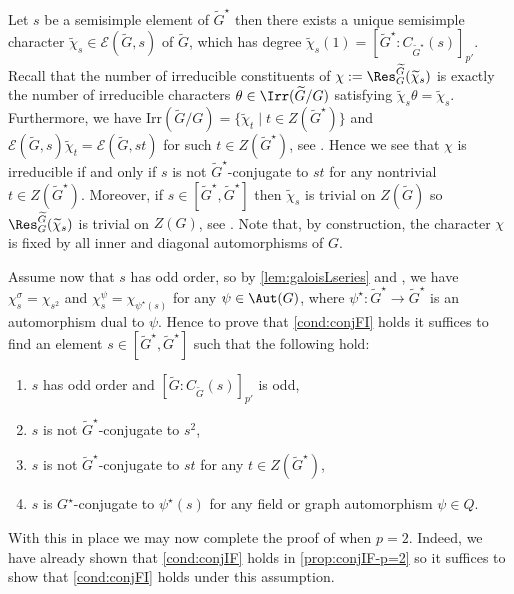 \documentclass[eqthmnum, nocolour]{jt-calcs}
\newcommand{\irr}{\mathrm{Irr}}
\begin{document}
\begin{pa}
Let $s$ be a semisimple element of $\widetilde{G}^\star$ then there exists a unique semisimple character $\widetilde{\chi}_s \in \mathcal{E}(\widetilde{G}, s)$ of $\widetilde{G}$, which has degree $\widetilde{\chi}_s(1) = [\widetilde{G}^{\star}:C_{\widetilde{G}^{\star}}(s)]_{p'}$. Recall that the number of irreducible constituents of $\chi := \Res_G^{\widetilde{G}}(\widetilde{\chi}_s)$ is exactly the number of irreducible characters $\theta \in \Irr(\widetilde{G}/G)$ satisfying $\widetilde{\chi}_s\theta = \widetilde{\chi}_s$. Furthermore, we have $\irr(\widetilde{G}/G) = \{\widetilde{\chi}_t \mid t \in Z(\widetilde{G}^{\star})\}$ and $\mathcal{E}(\widetilde{G}, s)\widetilde{\chi}_t = \mathcal{E}(\widetilde{G}, st)$ for such $t \in Z(\widetilde{G}^{\star})$, see \cite[13.30]{digne-michel:1991:representations-of-finite-groups-of-lie-type}. Hence we see that $\chi$ is irreducible if and only if $s$ is not $\widetilde{G}^\star$-conjugate to $st$ for any nontrivial $t\in Z(\widetilde{G}^\star)$. Moreover, if $s \in [\widetilde{G}^\star, \widetilde{G}^\star]$ then $\widetilde{\chi}_s$ is trivial on $Z(\widetilde{G})$ so $\Res^{\widetilde{G}}_G(\widetilde{\chi}_s)$ is trivial on $Z(G)$, see \cite[Lemma 4.4(ii)]{navarro-tiep:2013:characters-of-relative-pprime-degree}. Note that, by construction, the character $\chi$ is fixed by all inner and diagonal automorphisms of $G$.
\end{pa}

\begin{pa}\label{pa:s/s-inv}
Assume now that $s$ has odd order, so by \cref{lem:galoisLseries} and \cite[Corollary 2.4]{navarro-tiep-turull:2008:brauer-characters-with-cyclotomic}, we have $\chi_s^\sigma=\chi_{s^2}$ and $\chi_s^\psi=\chi_{\psi^{\star}(s)}$ for any $\psi \in \Aut(G)$, where $\psi^{\star} : \widetilde{G}^{\star} \to \widetilde{G}^{\star}$ is an automorphism dual to $\psi$. Hence to prove that \cref{cond:conjFI} holds it suffices to find an element $s \in [\widetilde{G}^\star, \widetilde{G}^\star]$ such that the following hold:
\begin{enumerate}[label=(S\arabic*)]
	\item $s$ has odd order and $[\widetilde{G}:C_{\widetilde{G}}(s)]_{p'}$ is odd,\label{it:S1}
	\item $s$ is not $\widetilde{G}^{\star}$-conjugate to $s^2$,\label{it:S2}
	\item $s$ is not $\widetilde{G}^{\star}$-conjugate to $st$ for any $t \in Z(\widetilde{G}^{\star})$,\label{it:S3}
	\item $s$ is $G^{\star}$-conjugate to $\psi^{\star}(s)$ for any field or graph automorphism $\psi \in Q$.\label{it:S4}
\end{enumerate}
With this in place we may now complete the proof of  when $p=2$. Indeed, we have already shown that \cref{cond:conjIF} holds in \cref{prop:conjIF-p=2} so it suffices to show that \cref{cond:conjFI} holds under this assumption.
\end{pa}
\end{document}
